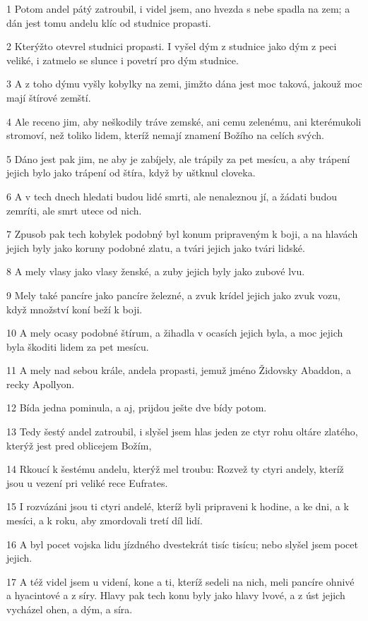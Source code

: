 \par 1 Potom andel pátý zatroubil, i videl jsem, ano hvezda s nebe spadla na zem; a dán jest tomu andelu klíc od studnice propasti.
\par 2 Kterýžto otevrel studnici propasti. I vyšel dým z studnice jako dým z peci veliké, i zatmelo se slunce i povetrí pro dým studnice.
\par 3 A z toho dýmu vyšly kobylky na zemi, jimžto dána jest moc taková, jakouž moc mají štírové zemští.
\par 4 Ale receno jim, aby neškodily tráve zemské, ani cemu zelenému, ani kterémukoli stromoví, než toliko lidem, kteríž nemají znamení Božího na celích svých.
\par 5 Dáno jest pak jim, ne aby je zabíjely, ale trápily za pet mesícu, a aby trápení jejich bylo jako trápení od štíra, když by uštknul cloveka.
\par 6 A v tech dnech hledati budou lidé smrti, ale nenaleznou jí, a žádati budou zemríti, ale smrt utece od nich.
\par 7 Zpusob pak tech kobylek podobný byl konum pripraveným k boji, a na hlavách jejich byly jako koruny podobné zlatu, a tvári jejich jako tvári lidské.
\par 8 A mely vlasy jako vlasy ženské, a zuby jejich byly jako zubové lvu.
\par 9 Mely také pancíre jako pancíre železné, a zvuk krídel jejich jako zvuk vozu, když množství koní beží k boji.
\par 10 A mely ocasy podobné štírum, a žihadla v ocasích jejich byla, a moc jejich byla škoditi lidem za pet mesícu.
\par 11 A mely nad sebou krále, andela propasti, jemuž jméno Židovsky Abaddon, a recky Apollyon.
\par 12 Bída jedna pominula, a aj, prijdou ješte dve bídy potom.
\par 13 Tedy šestý andel zatroubil, i slyšel jsem hlas jeden ze ctyr rohu oltáre zlatého, kterýž jest pred oblicejem Božím,
\par 14 Rkoucí k šestému andelu, kterýž mel troubu: Rozvež ty ctyri andely, kteríž jsou u vezení pri veliké rece Eufrates.
\par 15 I rozvázáni jsou ti ctyri andelé, kteríž byli pripraveni k hodine, a ke dni, a k mesíci, a k roku, aby zmordovali tretí díl lidí.
\par 16 A byl pocet vojska lidu jízdného dvestekrát tisíc tisícu; nebo slyšel jsem pocet jejich.
\par 17 A též videl jsem u videní, kone a ti, kteríž sedeli na nich, meli pancíre ohnivé a hyacintové a z síry. Hlavy pak tech konu byly jako hlavy lvové, a z úst jejich vycházel ohen, a dým, a síra.
